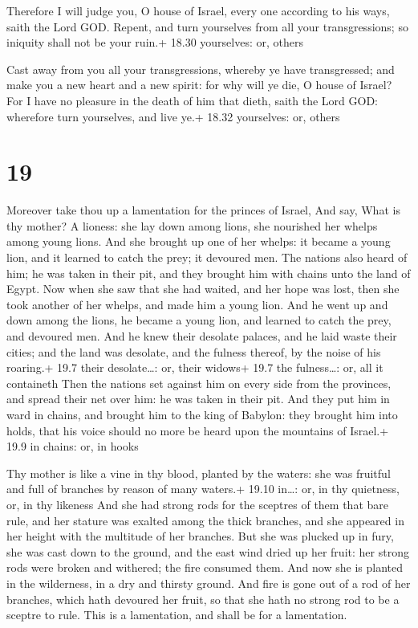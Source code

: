  Therefore I will judge you, O house of Israel, every one
according to his ways, saith the Lord GOD. Repent, and turn yourselves
from all your transgressions; so iniquity shall not be your ruin.+ 18.30
yourselves: or, others

 Cast away from you all your transgressions, whereby ye
have transgressed; and make you a new heart and a new spirit: for why
will ye die, O house of Israel?  For I have no pleasure in
the death of him that dieth, saith the Lord GOD: wherefore turn
yourselves, and live ye.+ 18.32 yourselves: or, others

\hypertarget{section-18}{%
\section{19}\label{section-18}}

 Moreover take thou up a lamentation for the princes of
Israel,  And say, What is thy mother? A lioness: she lay
down among lions, she nourished her whelps among young lions.
 And she brought up one of her whelps: it became a young
lion, and it learned to catch the prey; it devoured men. 
The nations also heard of him; he was taken in their pit, and they
brought him with chains unto the land of Egypt.  Now when
she saw that she had waited, and her hope was lost, then she took
another of her whelps, and made him a young lion.  And he
went up and down among the lions, he became a young lion, and learned to
catch the prey, and devoured men.  And he knew their
desolate palaces, and he laid waste their cities; and the land was
desolate, and the fulness thereof, by the noise of his roaring.+ 19.7
their desolate\ldots: or, their widows+ 19.7 the fulness\ldots: or, all
it containeth  Then the nations set against him on every
side from the provinces, and spread their net over him: he was taken in
their pit.  And they put him in ward in chains, and brought
him to the king of Babylon: they brought him into holds, that his voice
should no more be heard upon the mountains of Israel.+ 19.9 in chains:
or, in hooks

 Thy mother is like a vine in thy blood, planted by the
waters: she was fruitful and full of branches by reason of many waters.+
19.10 in\ldots: or, in thy quietness, or, in thy likeness 
And she had strong rods for the sceptres of them that bare rule, and her
stature was exalted among the thick branches, and she appeared in her
height with the multitude of her branches.  But she was
plucked up in fury, she was cast down to the ground, and the east wind
dried up her fruit: her strong rods were broken and withered; the fire
consumed them.  And now she is planted in the wilderness,
in a dry and thirsty ground.  And fire is gone out of a rod
of her branches, which hath devoured her fruit, so that she hath no
strong rod to be a sceptre to rule. This is a lamentation, and shall be
for a lamentation.


